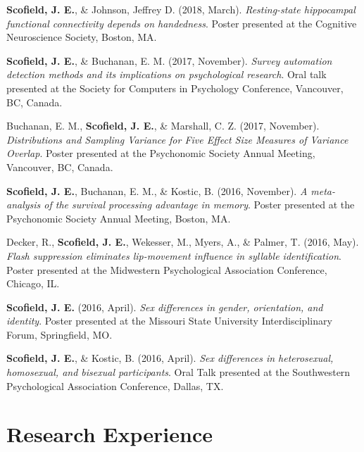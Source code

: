\documentclass[11pt, a4paper]{awesome-cv}
\begin{document}
\textbf{Scofield, J. E.}, \& Johnson, Jeffrey D. (2018, March). \emph{Resting-state hippocampal functional connectivity depends on handedness}. Poster presented at the Cognitive Neuroscience Society, Boston, MA.

\textbf{Scofield, J. E.}, \& Buchanan, E. M. (2017, November). \emph{Survey automation detection methods and its implications on psychological research}. Oral talk presented at the Society for Computers in Psychology Conference, Vancouver, BC, Canada.

Buchanan, E. M., \textbf{Scofield, J. E.}, \& Marshall, C. Z. (2017, November). \emph{Distributions and Sampling Variance for Five Effect Size Measures of Variance Overlap}. Poster presented at the Psychonomic Society Annual Meeting, Vancouver, BC, Canada.

\textbf{Scofield, J. E.}, Buchanan, E. M., \& Kostic, B. (2016, November). \emph{A meta-analysis of the survival processing advantage in memory}. Poster presented at the Psychonomic Society Annual Meeting, Boston, MA.

Decker, R., \textbf{Scofield, J. E.}, Wekesser, M., Myers, A., \& Palmer, T. (2016, May). \emph{Flash suppression eliminates lip-movement influence in syllable identification}. Poster presented at the Midwestern Psychological Association Conference, Chicago, IL.

\textbf{Scofield, J. E.} (2016, April). \emph{Sex differences in gender, orientation, and identity}. Poster presented at the Missouri State University Interdisciplinary Forum, Springfield, MO.

\textbf{Scofield, J. E.}, \& Kostic, B. (2016, April). \emph{Sex differences in heterosexual, homosexual, and bisexual participants}. Oral Talk presented at the Southwestern Psychological Association Conference, Dallas, TX.

\hypertarget{research-experience}{%
\section{Research Experience}\label{research-experience}}
\end{document}
